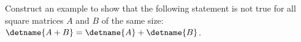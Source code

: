Construct an example to show that the following statement is not true for all square matrices $A$ and $B$ of the same size: $\detname{A+B}=\detname{A}+\detname{B}$.